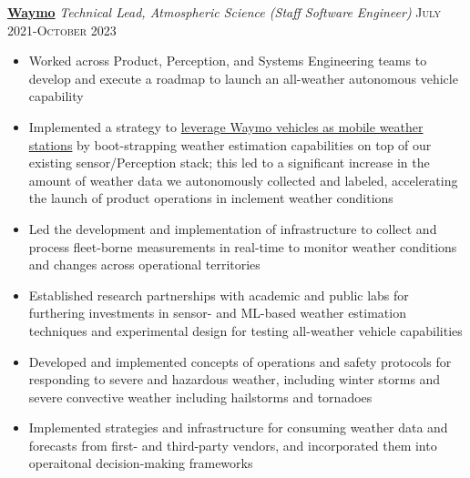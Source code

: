 \documentclass[11pt,letterpaper]{article}
\newcommand{\rdate}[1]{{\addfontfeature{Numbers=OldStyle} \hfill #1}}
\begin{document}
\medskip
\textbf{\href{http://www.waymo.com}{Waymo}} \newline
\emph{Technical Lead, Atmospheric Science (Staff Software Engineer)} \rdate{\textsc{July} 2021-\textsc{October} 2023}
\begin{itemize}[itemindent=-10pt]
	\item Worked across Product, Perception, and Systems Engineering teams to develop and execute a roadmap to launch an all-weather autonomous vehicle capability
	\item Implemented a strategy to \href{https://waymo.com/blog/2022/11/using-cutting-edge-weather-research-to-advance-the-Waymo-Driver.html}{leverage Waymo vehicles as mobile weather stations} by boot-strapping weather estimation capabilities on top of our existing sensor/Perception stack; this led to a significant increase in the amount of weather data we autonomously collected and labeled, accelerating the launch of product operations in inclement weather conditions
	\item Led the development and implementation of infrastructure to collect and process fleet-borne measurements in real-time to monitor weather conditions and changes across operational territories
	\item Established research partnerships with academic and public labs for furthering investments in sensor- and ML-based weather estimation techniques and experimental design for testing all-weather vehicle capabilities
	\item Developed and implemented concepts of operations and safety protocols for responding to severe and hazardous weather, including winter storms and severe convective weather including hailstorms and tornadoes
	\item Implemented strategies and infrastructure for consuming weather data and forecasts from first- and third-party vendors, and incorporated them into operaitonal decision-making frameworks
\end{itemize}
\end{document}
